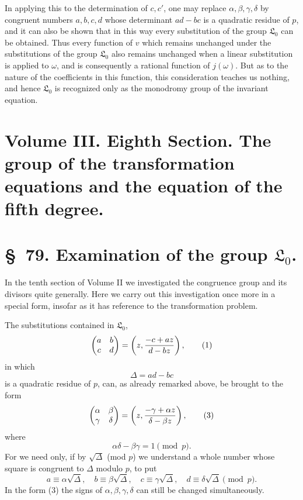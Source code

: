 \documentclass[11pt]{article}
\providecommand{\Lzero}{\mathfrak L_0}
\begin{document}
In applying this to the determination of $c,c'$, one may replace $\alpha,\beta,\gamma,\delta$ by congruent numbers $a,b,c,d$ whose determinant $ad-bc$ is a quadratic residue of $p$, and it can also be shown that in this way every substitution of the group $\mathfrak L_0$ can be obtained. Thus every function of $v$ which remains unchanged under the substitutions of the group $\mathfrak L_0$ also remains unchanged when a linear substitution is applied to $\omega$, and is consequently a rational function of $j(\omega)$. But as to the nature of the coefficients in this function, this consideration teaches us nothing, and hence $\mathfrak L_0$ is recognized only as the monodromy group of the invariant equation.

\clearpage
\section*{Volume III. Eighth Section. The group of the transformation equations and the equation of the fifth degree.}

\section*{\S~79. Examination of the group $\Lzero$.}

In the tenth section of Volume II we investigated the congruence group and its divisors quite generally. Here we carry out this investigation once more in a special form, insofar as it has reference to the transformation problem.

The substitutions contained in $\Lzero$,
\begin{equation}
 \begin{pmatrix}a&b\\ c&d\end{pmatrix}
 =\left(z,{ -c+az\over d-bz}\right),
\tag{1}
\end{equation}
in which
\begin{equation}
 \Delta=ad-bc
\tag{2}
\end{equation}
is a quadratic residue of $p$, can, as already remarked above, be brought to the form
\begin{equation}
 \begin{pmatrix}\alpha&\beta\\ \gamma&\delta\end{pmatrix}
 =\left(z,{ -\gamma+\alpha z\over \delta-\beta z}\right),
\tag{3}
\end{equation}
where
\begin{equation}
 \alpha\delta-\beta\gamma=1\pmod p.
\tag{4}
\end{equation}
For we need only, if by $\sqrt\Delta$ (mod $p$) we understand a whole number whose square is congruent to $\Delta$ modulo $p$, to put
\[
 a\equiv \alpha\sqrt\Delta,
 \quad b\equiv\beta\sqrt\Delta,
 \quad c\equiv\gamma\sqrt\Delta,
 \quad d\equiv\delta\sqrt\Delta\pmod p.
\]
In the form (3) the signs of $\alpha,\beta,\gamma,\delta$ can still be changed simultaneously.
\end{document}
